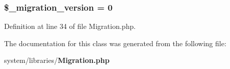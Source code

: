 \subsubsection[{\$\-\_\-migration\-\_\-version}]{\setlength{\rightskip}{0pt plus 5cm}\$\-\_\-migration\-\_\-version = 0\hspace{0.3cm}{\ttfamily [protected]}}\label{class_c_i___migration_a6bffbb1001557bd7ffb22183b51f589d}


Definition at line 34 of file Migration.\-php.



The documentation for this class was generated from the following file\-:\begin{DoxyCompactItemize}
\item 
system/libraries/{\bf Migration.\-php}\end{DoxyCompactItemize}
